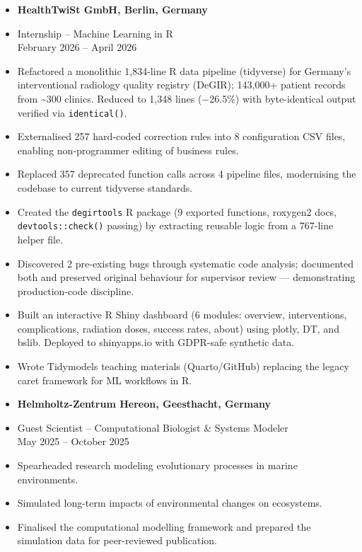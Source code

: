 \documentclass[margin,line,pifont,palatino,courier]{res}
\begin{document}
\begin{resume}
\begin{itemize}
\item {\bf HealthTwiSt GmbH, Berlin, Germany}\\
\vspace*{-.2in}
\item[] Internship -- Machine Learning in R\\
February 2026 -- April 2026
\vspace*{.1in}
\item[-] Refactored a monolithic 1,834-line R data pipeline (tidyverse) for Germany's interventional radiology quality registry (DeGIR); 143,000+ patient records from \textasciitilde300 clinics. Reduced to 1,348 lines ($-$26.5\%) with byte-identical output verified via \texttt{identical()}.
\item[-] Externalised 257 hard-coded correction rules into 8 configuration CSV files, enabling non-programmer editing of business rules.
\item[-] Replaced 357 deprecated function calls across 4 pipeline files, modernising the codebase to current tidyverse standards.
\item[-] Created the \texttt{degirtools} R package (9 exported functions, roxygen2 docs, \texttt{devtools::check()} passing) by extracting reusable logic from a 767-line helper file.
\item[-] Discovered 2 pre-existing bugs through systematic code analysis; documented both and preserved original behaviour for supervisor review --- demonstrating production-code discipline.
\item[-] Built an interactive R Shiny dashboard (6 modules: overview, interventions, complications, radiation doses, success rates, about) using plotly, DT, and bslib. Deployed to shinyapps.io with GDPR-safe synthetic data.
\item[-] Wrote Tidymodels teaching materials (Quarto/GitHub) replacing the legacy caret framework for ML workflows in R.
\end{itemize}
\vspace*{.1in}

\begin{itemize}
\item {\bf Helmholtz-Zentrum Hereon, Geesthacht, Germany}\\
\vspace*{-.2in}
\item[] Guest Scientist -- Computational Biologist \& Systems Modeler\\
May 2025 -- October 2025
\vspace*{.1in}
\item[-] Spearheaded research modeling evolutionary processes in marine environments.
\item[-] Simulated long-term impacts of environmental changes on ecosystems.
\item[-] Finalised the computational modelling framework and prepared the simulation data for peer-reviewed publication.
\end{itemize}
\vspace*{.1in}


\end{resume}
\end{document}
